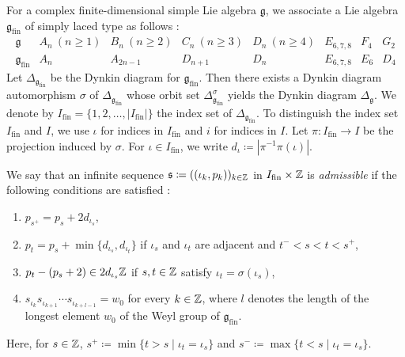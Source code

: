 For a complex finite-dimensional simple Lie algebra $\mathfrak{g}$,
we associate a Lie algebra $\mathfrak{g}_{\mathrm{fin}}$
of simply laced type as follows :
\[
\begin{array}{c||c|c|c|c|c|c|c}
\mathfrak{g} & A_n\ (n \geq 1) & B_n\ (n \geq 2) & C_n\ (n \geq 3)
& D_n\ (n \geq 4) & E_{6, 7, 8} & F_4 & G_2 \\
\hline
\mathfrak{g}_{\mathrm{fin}} & A_n & A_{2n - 1} & D_{n + 1}
& D_n & E_{6, 7, 8} & E_6 & D_4
\end{array}
\]
Let $\Delta_{\mathfrak{g}_{\mathrm{fin}}}$ be the Dynkin diagram
for $\mathfrak{g}_{\mathrm{fin}}$.
Then there exists a Dynkin diagram automorphism $\sigma$
of $\Delta_{\mathfrak{g}_{\mathrm{fin}}}$ whose orbit set
$\Delta_{\mathfrak{g}_{\mathrm{fin}}}^{\sigma}$
yields the Dynkin diagram $\Delta_{\mathfrak{g}}$.
We denote by $I_{\mathrm{fin}} = \{1, 2, \ldots, |I_{\mathrm{fin}}|\}$
the index set of $\Delta_{\mathfrak{g}_{\mathrm{fin}}}$.
To distinguish the index set $I_{\mathrm{fin}}$ and $I$,
we use $\iota$ for indices in $I_{\mathrm{fin}}$
and $i$ for indices in $I$.
Let $\pi \colon I_{\mathrm{fin}} \to I$
be the projection induced by $\sigma$.
For $\iota \in I_{\mathrm{fin}}$,
we write $d_{\iota} \coloneq |\pi^{-1}\pi(\iota)|$.

\begin{Def}
\label{Def : admissible sequence}
We say that an infinite sequence
$\mathfrak{s} \coloneq ((\iota_k, p_k))_{k \in \mathbb{Z}}$
in $I_{\mathrm{fin}} \times \mathbb{Z}$ is \emph{admissible}
if the following conditions are satisfied :
\begin{enumerate}
    \item[(1)] $p_{s^{+}} = p_s + 2d_{\iota_s}$,
    \item[(2)] $p_t = p_s + \min\{d_{\iota_s}, d_{\iota_t}\}$
    if $\iota_s$ and $\iota_t$ are adjacent
    and $t^{-} < s < t < s^{+}$,
    \item[(3)] $p_t - (p_s + 2) \in 2d_{\iota_s}\mathbb{Z}$
    if $s, t \in \mathbb{Z}$ satisfy $\iota_t = \sigma(\iota_s)$,
    \item[(4)] $s_{\iota_k}s_{\iota_{k + 1}}\cdots
    s_{\iota_{k + l - 1}} = w_0$ for every $k \in \mathbb{Z}$,
    where $l$ denotes the length of the longest element $w_0$
    of the Weyl group of $\mathfrak{g}_{\mathrm{fin}}$.
\end{enumerate}
Here, for $s \in \mathbb{Z}$,
$s^{+} \coloneq \min\{t > s \mid \iota_t = \iota_s\}$
and $s^{-} \coloneq \max\{t < s \mid \iota_t = \iota_s\}$.
\end{Def}

